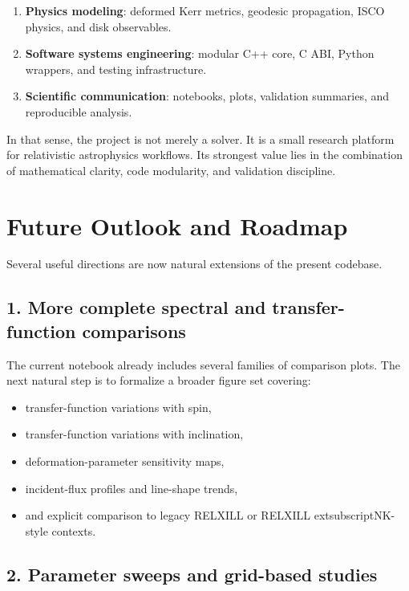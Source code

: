 \documentclass[11pt]{article}
\begin{document}
\begin{enumerate}[leftmargin=1.5em]
    \item \textbf{Physics modeling}: deformed Kerr metrics, geodesic propagation, ISCO physics, and disk observables.
    \item \textbf{Software systems engineering}: modular C++ core, C ABI, Python wrappers, and testing infrastructure.
    \item \textbf{Scientific communication}: notebooks, plots, validation summaries, and reproducible analysis.
\end{enumerate}

In that sense, the project is not merely a solver. It is a small research platform for relativistic astrophysics workflows. Its strongest value lies in the combination of mathematical clarity, code modularity, and validation discipline.

\section{Future Outlook and Roadmap}

Several useful directions are now natural extensions of the present codebase.

\subsection{1. More complete spectral and transfer-function comparisons}

The current notebook already includes several families of comparison plots. The next natural step is to formalize a broader figure set covering:

\begin{itemize}[leftmargin=1.5em]
    \item transfer-function variations with spin,
    \item transfer-function variations with inclination,
    \item deformation-parameter sensitivity maps,
    \item incident-flux profiles and line-shape trends,
    \item and explicit comparison to legacy RELXILL or RELXILL	extsubscript{NK}-style contexts.
\end{itemize}

\subsection{2. Parameter sweeps and grid-based studies}
\end{document}
